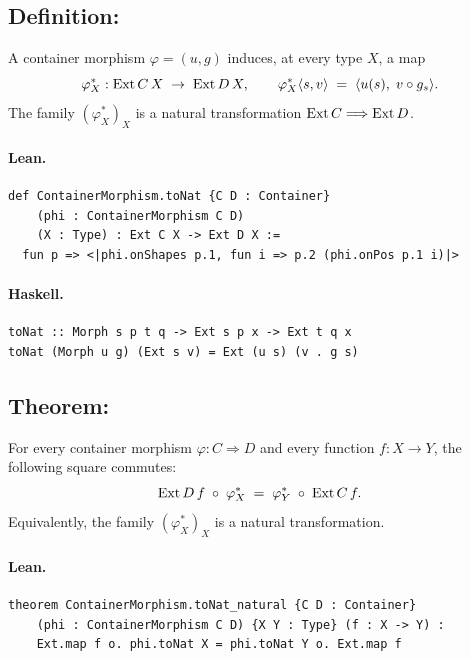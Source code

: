 \documentclass[11pt,a4paper]{article}
\begin{document}
\subsection{Definition: }

\begin{defn}
A container morphism $\varphi = (u, g)$ induces, at every type $X$, a map
\[
  \varphi^*_X : \mathrm{Ext}\,C\,X \;\to\; \mathrm{Ext}\,D\,X, \qquad
  \varphi^*_X\langle s, v \rangle \;=\; \langle u(s),\; v \circ g_s \rangle.
\]
The family $(\varphi^*_X)_X$ is a natural transformation
$\mathrm{Ext}\,C \Longrightarrow \mathrm{Ext}\,D$.
\end{defn}

\paragraph{Lean.}
\begin{lstlisting}[style=lean]
def ContainerMorphism.toNat {C D : Container}
    (phi : ContainerMorphism C D)
    (X : Type) : Ext C X -> Ext D X :=
  fun p => <|phi.onShapes p.1, fun i => p.2 (phi.onPos p.1 i)|>
\end{lstlisting}

\paragraph{Haskell.}
\begin{lstlisting}[style=haskell]
toNat :: Morph s p t q -> Ext s p x -> Ext t q x
toNat (Morph u g) (Ext s v) = Ext (u s) (v . g s)
\end{lstlisting}


\subsection{Theorem: }

\begin{thm}[Naturality]
For every container morphism $\varphi : C \Rightarrow D$ and every function
$f : X \to Y$, the following square commutes:
\[
  \mathrm{Ext}\,D\,f \;\circ\; \varphi^*_X
  \;=\;
  \varphi^*_Y \;\circ\; \mathrm{Ext}\,C\,f.
\]
Equivalently, the family $(\varphi^*_X)_X$ is a natural transformation.
\end{thm}

\paragraph{Lean.}
\begin{lstlisting}[style=lean]
theorem ContainerMorphism.toNat_natural {C D : Container}
    (phi : ContainerMorphism C D) {X Y : Type} (f : X -> Y) :
    Ext.map f o. phi.toNat X = phi.toNat Y o. Ext.map f
\end{lstlisting}
\end{document}
